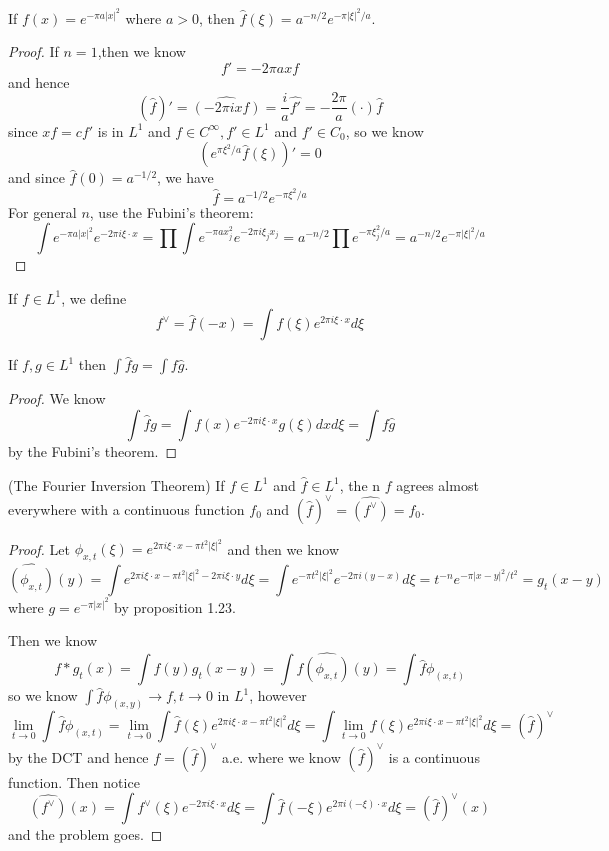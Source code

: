 \begin{proposition}
    If $f(x) = e^{-\pi a |x|^2}$ where $a>0$, then $\hat{f}(\xi) = a^{-n/2}e^{-\pi|\xi|^2/a}$.
\end{proposition}
\begin{proof}\par
    If $n=1$,then we know
    \[f' = -2\pi axf\]
    and hence
    \[
    (\hat{f})' = \hat{(-2\pi i x f)} = \dfrac{i}{a}\hat{f'} = -\dfrac{2\pi}{a} (\cdot)\hat{f}
    \]
    since $xf = cf'$ is in $L^1$ and $f\in C^{\infty}, f'\in L^1$ and $f'\in C_0$, so we know
    \[(e^{\pi\xi^2/a}\hat{f}(\xi))' = 0\]
    and since $\hat{f}(0) = a^{-1/2}$, we have
    \[
    \hat{f} = a^{-1/2}e^{-\pi\xi^2/a}
    \]
    For general $n$, use the Fubini's theorem:
    \[
    \int e^{-\pi a|x|^2}e^{-2\pi i \xi\cdot x} = \prod\int e^{-\pi ax_j^2}e^{-2\pi i \xi_jx_j} = a^{-n/2}\prod e^{-\pi \xi_j^2/a} = a^{-n/2} e^{-\pi|\xi|^2/a}
    \]
\end{proof}

\begin{definition}
    If $f\in L^1$, we define
    \[f^{\vee} = \hat{f}(-x) = \int f(\xi)e^{2\pi i \xi\cdot x} d\xi\]
\end{definition}

\begin{lemma}
    If $f,g\in L^1$ then $\int\hat{f}g = \int f\hat{g}$.
\end{lemma}
\begin{proof}\par
    We know
    \[
    \int\hat{f}g = \int f(x)e^{-2\pi i \xi\cdot x} g(\xi) dx d\xi = \int f\hat{g}
    \]
    by the Fubini's theorem.
\end{proof}

\begin{theorem}
    (The Fourier Inversion Theorem) If $f\in L^1$ and $\hat{f}\in L^1$, the n $f$ agrees almost everywhere with a continuous function $f_0$ and $(\hat{f})^{\vee} = \hat{(f^{\vee})} = f_0$.
\end{theorem}
\begin{proof}\par
    Let $\phi_{x,t}(\xi) = e^{2\pi i \xi\cdot x - \pi t^2|\xi|^2}$ and then we know
    \[
    \hat{(\phi_{x,t})}(y) = \int e^{2\pi i \xi\cdot x- \pi t^2|\xi|^2-2\pi i \xi\cdot y}d\xi = \int e^{-\pi t^2|\xi|^2}e^{-2\pi i (y-x)}d\xi = t^{-n}e^{-\pi |x-y|^2/t^2} = g_t(x-y)
    \]
    where $g = e^{-\pi|x|^2}$ by proposition 1.23.\par
    Then we know
    \[
    f*g_t(x) = \int f(y)g_t(x-y) = \int f\hat{(\phi_{x,t})}(y) = \int \hat{f}\phi_{(x,t)}
    \]
    so we know $\int\hat{f}\phi_{(x,y)} \to f,t\to 0$ in $L^1$, however
    \[
    \lim_{t\to 0}\int\hat{f}\phi_{(x,t)} = \lim_{t\to 0}\int\hat{f}(\xi)e^{2\pi i \xi\cdot x - \pi t^2|\xi|^2}d\xi = \int \lim_{t\to 0}\hat{f}(\xi)e^{2\pi i \xi\cdot x - \pi t^2|\xi|^2}d\xi = (\hat{f})^{\vee}
    \]
    by the DCT and hence $f = (\hat{f})^{\vee}$ a.e. where we know $(\hat{f})^{\vee}$ is a continuous function. Then notice
    \[
    \hat{(f^{\vee})}(x) = \int f^{\vee}(\xi)e^{-2\pi i \xi\cdot x}d\xi = \int \hat{f}(-\xi)e^{2\pi i (-\xi)\cdot x} d\xi = (\hat{f})^{\vee}(x)
    \]
    and the problem goes.
\end{proof}

